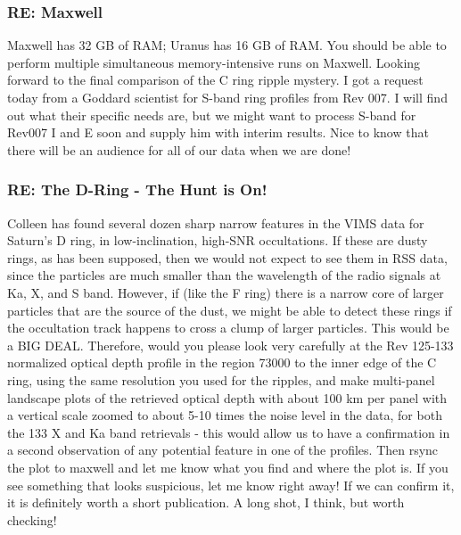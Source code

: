\documentclass[crop=false,class=book]{standalone}
\begin{document}
\subsubsection{\footnotesize RE: Maxwell}
Maxwell has 32 GB of RAM; Uranus has 16 GB of RAM. You should be able to perform multiple simultaneous memory-intensive runs on Maxwell. Looking forward to the final comparison of the C ring ripple mystery. I got a request today from a Goddard scientist for S-band ring profiles from Rev 007. I will find out what their specific needs are, but we might want to process S-band for Rev007 I and E soon and supply him with interim results. Nice to know that there will be an audience for all of our data when we are done!
\subsubsection{\footnotesize RE: The D-Ring - The Hunt is On!}
Colleen has found several dozen sharp narrow features in the VIMS data for Saturn's D ring, in low-inclination, high-SNR occultations. If these are dusty rings, as has been supposed, then we would not expect to see them in RSS data, since the particles are much smaller than the wavelength of the radio signals at Ka, X, and S band. However, if (like the F ring) there is a narrow core of larger particles that are the source of the dust, we might be able to detect these rings if the occultation track happens to cross a clump of larger particles. This would be a BIG DEAL. Therefore, would you please look very carefully at the Rev 125-133 normalized optical depth profile in the region 73000 to the inner edge of the C ring, using the same resolution you used for the ripples, and make multi-panel landscape plots of the retrieved optical depth with about 100 km per panel with a vertical scale zoomed to about 5-10 times the noise level in the data, for both the 133 X and Ka band retrievals - this would allow us to have a confirmation in a second observation of any potential feature in one of the profiles. Then rsync the plot to maxwell and let me know what you find and where the plot is. If you see something that looks suspicious, let me know right away! If we can confirm it, it is definitely worth a short publication. A long shot, I think, but worth checking!
\end{document}
